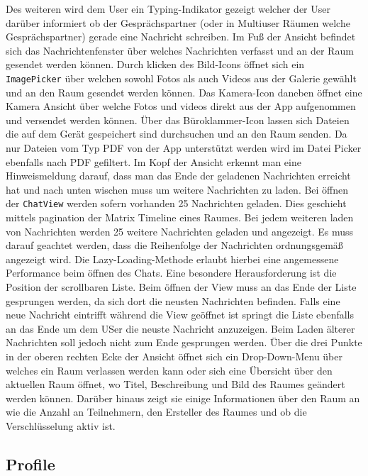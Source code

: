     Des weiteren wird dem User ein Typing-Indikator gezeigt welcher der User darüber informiert ob der Gesprächspartner (oder in Multiuser Räumen welche Gesprächspartner) gerade eine Nachricht schreiben.
    Im Fuß der Ansicht befindet sich das Nachrichtenfenster über welches Nachrichten verfasst und an der Raum gesendet werden können.
    Durch klicken des Bild-Icons öffnet sich ein \texttt{ImagePicker} über welchen sowohl Fotos als auch Videos aus der Galerie gewählt und an den Raum gesendet werden können.
    Das Kamera-Icon daneben öffnet eine Kamera Ansicht über welche Fotos und videos direkt aus der App aufgenommen und versendet werden können.
    Über das Büroklammer-Icon lassen sich Dateien die auf dem Gerät gespeichert sind durchsuchen und an den Raum senden.
    Da nur Dateien vom Typ PDF von der App unterstützt werden wird im Datei Picker ebenfalls nach PDF gefiltert.
    Im Kopf der Ansicht erkennt man eine Hinweismeldung darauf, dass man das Ende der geladenen Nachrichten erreicht hat und nach unten wischen muss um weitere Nachrichten zu laden.
    Bei öffnen der \texttt{ChatView} werden sofern vorhanden 25 Nachrichten geladen.
    Dies geschieht mittels pagination der Matrix Timeline eines Raumes.
    Bei jedem weiteren laden von Nachrichten werden 25 weitere Nachrichten geladen und angezeigt.
    Es muss darauf geachtet werden, dass die Reihenfolge der Nachrichten ordnungsgemäß angezeigt wird.
    Die Lazy-Loading-Methode erlaubt hierbei eine angemessene Performance beim öffnen des Chats.
    Eine besondere Herausforderung ist die Position der scrollbaren Liste.
    Beim öffnen der View muss an das Ende der Liste gesprungen werden, da sich dort die neusten Nachrichten befinden.
    Falls eine neue Nachricht eintrifft während die View geöffnet ist springt die Liste ebenfalls an das Ende um dem USer die neuste Nachricht anzuzeigen.
    Beim Laden älterer Nachrichten soll jedoch nicht zum Ende gesprungen werden.
    Über die drei Punkte in der oberen rechten Ecke der Ansicht öffnet sich ein Drop-Down-Menu über welches ein Raum verlassen werden kann oder sich eine Übersicht über den aktuellen Raum öffnet, wo Titel, Beschreibung und Bild des Raumes geändert werden können.
    Darüber hinaus zeigt sie einige Informationen über den Raum an wie die Anzahl an Teilnehmern, den Ersteller des Raumes und ob die Verschlüsselung aktiv ist.

    \newpage
    \subsection{Profile}\label{subsec:profile}


